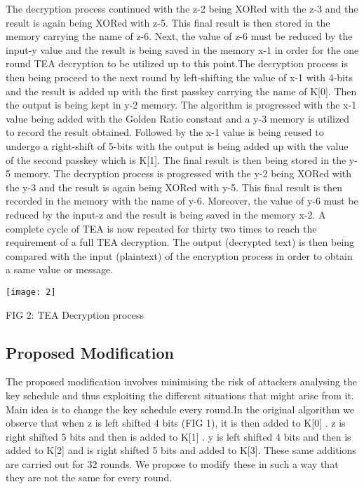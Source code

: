 \documentclass[letterpaper, 12 pt, conference]{ieeeconf}  %
\begin{document}
 The decryption process continued with the z-2 being XORed with the z-3 and the result is again being XORed with z-5. This final result is then stored in the memory carrying the name of z-6.
 Next, the value of z-6 must be reduced by the input-y value and the result is being saved in the memory x-1 in order for the one round TEA decryption to be utilized up to this point.The decryption process is then being proceed to the next round by left-shifting the value of x-1 with 4-bits and the result is added up with the first passkey carrying the name of K[0]. Then the output is being kept in y-2 memory. The algorithm is progressed with the x-1 value being added with the Golden Ratio constant and a y-3 memory is utilized to record the result obtained. Followed by the x-1 value is being reused to undergo a right-shift of 5-bits with the output is being added up with the value of the second passkey which is K[1]. The final result is then being stored in the y-5 memory.
 The decryption process is progressed with the y-2 being XORed with the y-3 and the result is again being XORed with y-5. This final result is then recorded in the memory with the name of y-6.
 Moreover, the value of y-6 must be reduced by the input-z and the result is being saved in the memory x-2. A complete cycle of TEA is now repeated for thirty two times to reach the requirement of a full TEA decryption. The output (decrypted text) is then being compared with the input (plaintext) of the encryption process in order to obtain a same value or message. 

\texttt{[image: 2]}

FIG 2: TEA Decryption process



\subsection{Proposed Modification}
The proposed modification involves minimising the risk of attackers analysing the key schedule and thus exploiting the different situations that might arise from it. Main idea is to change the key schedule every round.In the original algorithm we observe that when z is left shifted 4 bits (FIG 1), it is then added to K[0] . z is right shifted 5 bits and then is added to K[1] . y is left shifted 4 bits and then is added to K[2] and is right shifted 5 bits and added to K[3]. These same additions are carried out for 32 rounds. We propose to modify these in such a way that they are not the same for every round.
\end{document}
